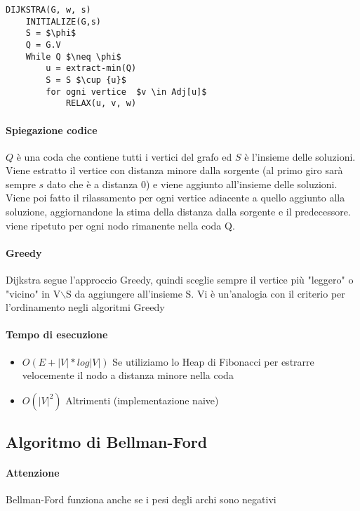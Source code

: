 \documentclass[12pt, a4paper, openany]{book}
\begin{document}
\begin{lstlisting}
DIJKSTRA(G, w, s)
    INITIALIZE(G,s)
    S = $\phi$
    Q = G.V
    While Q $\neq \phi$
        u = extract-min(Q)
        S = S $\cup {u}$
        for ogni vertice  $v \in Adj[u]$ 
            RELAX(u, v, w)
\end{lstlisting}

\paragraph{Spiegazione codice}
$Q$ è una coda che contiene tutti i vertici del grafo ed $S$ è l'insieme delle soluzioni.
Viene estratto il vertice con distanza minore dalla sorgente (al primo giro sarà sempre $s$ dato che è
a distanza 0) e viene aggiunto all'insieme delle soluzioni. Viene poi fatto il rilassamento per ogni vertice adiacente
a quello aggiunto alla soluzione, aggiornandone la stima della distanza dalla sorgente e il predecessore.
viene ripetuto per ogni nodo rimanente nella coda Q.

\paragraph{Greedy}
Dijkstra segue l'approccio Greedy, quindi sceglie sempre il vertice più "leggero" o "vicino" in V$\backslash$S
da aggiungere all'insieme S. Vi è un'analogia con il criterio per l'ordinamento negli algoritmi Greedy

\paragraph{Tempo di esecuzione}
\begin{itemize}
	\item $O(E + |V|*log|V|)$ Se utiliziamo lo Heap di Fibonacci per estrarre velocemente il nodo a distanza minore nella coda
	\item $O(|V|^2)$ Altrimenti (implementazione naive)
\end{itemize}

\subsection{Algoritmo di Bellman-Ford}

\paragraph{Attenzione}
Bellman-Ford funziona anche se i pesi degli archi sono negativi
\end{document}
